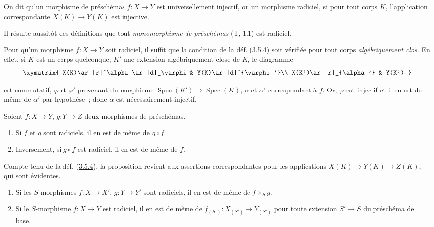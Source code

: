 \begin{definition}[3.5.4]
\label{I.3.5.4-fr}
On dit qu'un morphisme de préschémas $f:X\to Y$ est universellement
injectif, ou un morphisme radiciel, si pour tout corps $K$,
l'application correspondante $X(K)\to Y(K)$ est injective.
\end{definition}

Il résulte aussitôt des définitions que tout \emph{monomorphisme de
préschémas} (T, 1.1) est radiciel.

\begin{env}[3.5.5]
\label{I.3.5.5-fr}
Pour qu'un morphisme $f:X\to Y$ soit radiciel, il suffit que la condition de
la déf. (\hyperref[I.3.5.4-fr]{3.5.4}) soit vérifiée pour tout corps
\emph{algébriquement clos}. En effet, si $K$ est un corps quelconque, $K'$ une
extension algébriquement close de $K$, le diagramme
\label{I.3.5.5.algebraic-closure-diagram-fr}
\[
  \xymatrix{
    X(K)\ar[r]^\alpha\ar[d]_\varphi & Y(K)\ar[d]^{\varphi'}\\
    X(K')\ar[r]_{\alpha'} & Y(K')
  }
\]

est commutatif, $\varphi$ et $\varphi'$ provenant du morphisme
$\operatorname{Spec}(K')\to\operatorname{Spec}(K)$, $\alpha$ et $\alpha'$
correspondant à $f$. Or, $\varphi$ est injectif et il en est de même de
$\alpha'$ par hypothèse~; donc $\alpha$ est nécessairement injectif.
\end{env}

\begin{proposition}[3.5.6]
\label{I.3.5.6-fr}
Soient $f:X\to Y$, $g:Y\to Z$ deux morphismes de préschémas.
\begin{enumerate}
  \item[(i)] Si $f$ et $g$ sont radiciels, il en est de même de $g\circ f$.
  \item[(ii)] Inversement, si $g\circ f$ est radiciel, il en est de même de
  $f$.
\end{enumerate}
\end{proposition}

Compte tenu de la déf. (\hyperref[I.3.5.4-fr]{3.5.4}), la proposition revient
aux assertions correspondantes pour les applications
$X(K)\to Y(K)\to Z(K)$, qui sont évidentes.

\begin{proposition}[3.5.7]
\label{I.3.5.7-fr}
\begin{enumerate}
  \item[(i)] Si les $S$-morphismes $f:X\to X'$, $g:Y\to Y'$ sont radiciels,
  il en est de même de $f\times_S g$.
  \item[(ii)] Si le $S$-morphisme $f:X\to Y$ est radiciel, il en est de même
  de $f_{(S')}:X_{(S')}\to Y_{(S')}$ pour toute extension $S'\to S$ du
  préschéma de base.
\end{enumerate}
\end{proposition}

